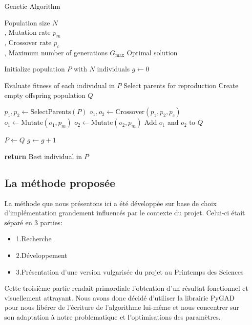 \documentclass[journal, a4paper]{IEEEtran}
\begin{document}
	\begin{algorithm}
		  \caption{Genetic Algorithm}\label{alg:ga}
		  \begin{algorithmic}
			\Require Population size $N$
			\\ , Mutation rate $p_m$
			\\ , Crossover rate $p_c$
			\\ , Maximum number of generations $G_{\max}$
			\Ensure Optimal solution

			\State Initialize population $P$ with $N$ individuals
			\State $g \gets 0$

			  \State Evaluate fitness of each individual in $P$
			  \State Select parents for reproduction
			  \State Create empty offspring population $Q$

				\State $p_1, p_2 \gets \text{SelectParents}(P)$
				\State $o_1, o_2 \gets \text{Crossover}(p_1, p_2, p_c)$
				\State $o_1 \gets \text{Mutate}(o_1, p_m)$
				\State $o_2 \gets \text{Mutate}(o_2, p_m)$
				\State Add $o_1$ and $o_2$ to $Q$
			  \EndWhile

			  \State $P \gets Q$
			  \State $g \gets g + 1$
			\EndWhile

			\State \textbf{return} Best individual in $P$
		  \end{algorithmic}
	\end{algorithm}


	\subsection{La méthode proposée}\label{subsec:la-methode-proposee}
	La méthode que nous présentons ici a été développée sur base de
	choix d'implémentation grandement influencés par le contexte du
	projet.
	Celui-ci était séparé en 3 parties:
	\begin{itemize}
		\item 1.Recherche
		\item 2.Développement
		\item 3.Présentation d'une version vulgarisée du projet au
		Printemps des Sciences
	\end{itemize}
	Cette troisième partie rendait primordiale l'obtention d'un
	résultat
	fonctionnel et visuellement attrayant.
	Nous avons donc décidé d'utiliser la librairie PyGAD\cite{pygad}
	pour nous libérer de l'écriture de l'algorithme lui-même et nous
	concentrer sur son adaptation à notre problematique et
	l'optimisations des paramètres.
\end{document}
